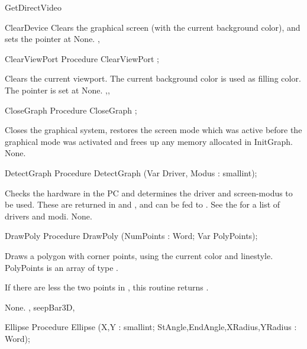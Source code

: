 \begin{function}{GetDirectVideo}
\begin{procedure}{ClearDevice}
\Description
Clears the graphical screen (with the current
background color), and sets the pointer at 
\Errors
None.
\SeeAlso
{}, 
\end{procedure}

\begin{procedure}{ClearViewPort}
\Declaration
Procedure ClearViewPort ;

\Description
Clears the current viewport. The current background color is used as filling
color. The pointer is set at 
\Errors
None.
\SeeAlso
{},, 
\end{procedure}

\begin{procedure}{CloseGraph}
\Declaration
Procedure CloseGraph ;

\Description
Closes the graphical system, restores the
screen mode which was active before the graphical mode was
activated and frees up any memory allocated in InitGraph.
\Errors
None.
\SeeAlso
{}
\end{procedure}

\begin{procedure}{DetectGraph}
\Declaration
Procedure DetectGraph (Var Driver, Modus : smallint);

\Description
 Checks the hardware in the PC and determines the driver and screen-modus to
be used. These are returned in  and , and can be fed
to .
See the  for a list of drivers and modi.
\Errors
None.
\SeeAlso
{}
\end{procedure}


\begin{procedure}{DrawPoly}
\Declaration
Procedure DrawPoly (NumPoints : Word; Var PolyPoints);

\Description

Draws a polygon with  corner points, using the
current color and linestyle. PolyPoints is an array of type .

If there are less the two points in , this routine
returns .

\Errors
None.
\SeeAlso
{}, seep{Bar3D}, 
\end{procedure}

\begin{procedure}{Ellipse}
\Declaration
Procedure Ellipse (X,Y : smallint; StAngle,EndAngle,XRadius,YRadius : Word);


\end{procedure}
\end{function}
